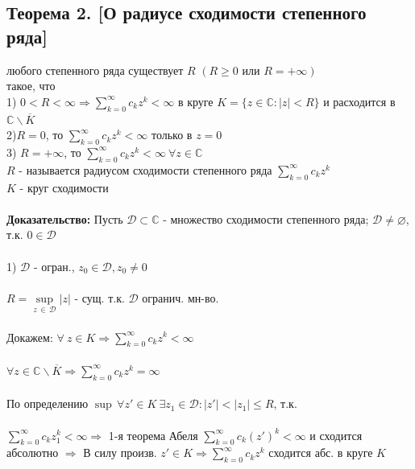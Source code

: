\documentclass[a4paper,12pt]{article} %
\begin{document}
\subsection*{Теорема 2. [О радиусе сходимости степенного ряда]}
 любого степенного ряда существует $R \, \, (R \geqslant 0 \text{ или } R = +\infty)$\\
 такое, что \\
 1) $0 < R < \infty \Rightarrow \sum\limits_{k = 0}^\infty c_k z^k < \infty$ в круге $K = \{ z \in \mathbb{C} : |z| < R\}$ и расходится в $\mathbb{C} \backslash \overline{K}$\\
 2)$R = 0$, то $\sum\limits_{k = 0}^\infty c_k z^k < \infty$ только в $z = 0$\\
 3) $R = +\infty$, то $\sum\limits_{k = 0}^\infty c_k z^k < \infty \  \forall z \in \mathbb{C}$\\
 $R$ - называется радиусом сходимости степенного ряда $\sum\limits_{k = 0}^\infty c_k z^k$ \\
 $K$ - круг сходимости\\
 \ \\
 \noindent\textbf{Доказательство:} Пусть $\mathscr{D} \subset \mathbb{C}$ - множество сходимости степенного ряда; $\mathscr{D} \neq \varnothing$, т.к. $0 \in \mathscr{D}$\\
 \ \\
 1) $\mathscr{D}$ - огран., $z_0 \in \mathscr{D}, z_0 \neq 0$ \\
 \ \\
 $R = \underset{z \, \in \, \mathscr{D}}{\sup} |z| $ - сущ. т.к. $\mathscr{D}$ огранич. мн-во.\\
 \ \\
 Докажем: $\forall \  z \in K \Rightarrow  \sum\limits_{k = 0}^\infty c_k z^k < \infty$ \\
 \ \\
 $\forall z \in \mathbb{C} \backslash \overline{K} \Rightarrow  \sum\limits_{k = 0}^\infty c_k z^k = \infty$\\
 \ \\
 По определению $\sup \, \forall z'\in K \  \exists z_1 \in \mathscr{D} : |z'| < |z_1| \leqslant R$, т.к. \\
 \ \\
 $ \sum\limits_{k = 0}^\infty c_k z_1^k < \infty \Rightarrow$ 1-я теорема Абеля $ \sum\limits_{k = 0}^\infty c_k (z')^k < \infty$ и сходится абсолютно $\Rightarrow$ В силу произв. $z' \in K \Rightarrow  \sum\limits_{k = 0}^\infty c_k z^k$ сходится абс. в круге $K$\\
\end{document}
